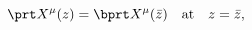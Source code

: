 \begin{equation}
\prt X^\mu(z)=\bprt X^\mu(\bar z)\quad \mbox{at}\quad z=\bar z,
\label{normal Neumann}
\end{equation}

